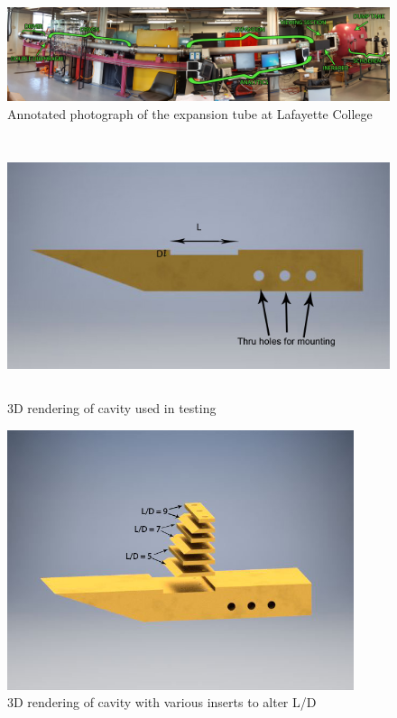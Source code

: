 \newpage

\begin{figure}
\centering
\includegraphics[width=\textwidth]{Figures/TubeLabeled.jpg}
\caption[Annotated Expansion Tube]{Annotated photograph of the expansion tube at Lafayette College}
\label{fig:tubelabeled}
\end{figure}

\begin{figure}
\centering
\includegraphics[height = 3in]{Figures/Cavitylabel.jpg}
\caption[Cavity 3D Model]{3D rendering of cavity used in testing}
\label{fig:cavModel}
\end{figure}

\begin{figure}
\centering
\includegraphics[height = 3in]{Figures/CavityInserts.jpg}
\caption[Cavity Model with Inserts]{3D rendering of cavity with various inserts to alter L/D}
\label{fig:cavInserts}
\end{figure}


